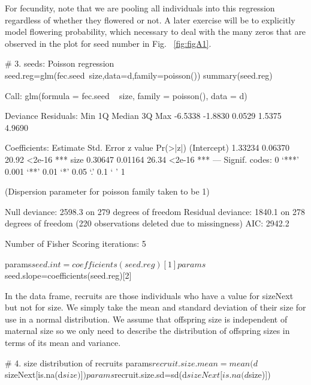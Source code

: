 \documentclass[11pt]{article}
\begin{document}
For fecundity, note that we are pooling all individuals into this regression regardless of whether they flowered or not. A later exercise will be to explicitly model flowering probability, which necessary to deal with the many zeros that are observed in the plot for seed number in Fig. ~\ref{fig:figA1}.

\begin{Schunk}
\begin{Sinput}
 # 3. seeds: Poisson regression
 seed.reg=glm(fec.seed~size,data=d,family=poisson())
 summary(seed.reg)
\end{Sinput}
\begin{Soutput}
Call:
glm(formula = fec.seed ~ size, family = poisson(), data = d)

Deviance Residuals: 
    Min       1Q   Median       3Q      Max  
-6.5338  -1.8830   0.0529   1.5375   4.9690  

Coefficients:
            Estimate Std. Error z value Pr(>|z|)    
(Intercept)  1.33234    0.06370   20.92   <2e-16 ***
size         0.30647    0.01164   26.34   <2e-16 ***
---
Signif. codes:  
0 ‘***’ 0.001 ‘**’ 0.01 ‘*’ 0.05 ‘.’ 0.1 ‘ ’ 1

(Dispersion parameter for poisson family taken to be 1)

    Null deviance: 2598.3  on 279  degrees of freedom
Residual deviance: 1840.1  on 278  degrees of freedom
  (220 observations deleted due to missingness)
AIC: 2942.2

Number of Fisher Scoring iterations: 5
\end{Soutput}
\begin{Sinput}
 params$seed.int=coefficients(seed.reg)[1]
 params$seed.slope=coefficients(seed.reg)[2]
\end{Sinput}
\end{Schunk}
In the data frame, recruits are those individuals who have a value for sizeNext but not for size. We simply take the mean and standard deviation of their size for use in a normal distribution. We assume that offspring size is independent of maternal size so we only need to describe the distribution of offspring sizes in terms of its mean and variance.
\begin{Schunk}
\begin{Sinput}
 # 4. size distribution of recruits
 params$recruit.size.mean=mean(d$sizeNext[is.na(d$size)])
 params$recruit.size.sd=sd(d$sizeNext[is.na(d$size)])
\end{Sinput}
\end{Schunk}
\end{document}
